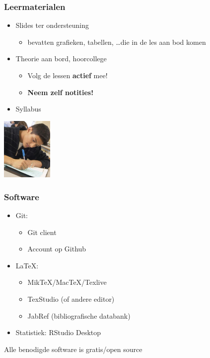 \documentclass{beamer}
\begin{document}
\begin{frame}
  \frametitle{Leermaterialen}

  \begin{itemize}
    \item Slides ter ondersteuning
      \begin{itemize}
        \item bevatten grafieken, tabellen, \ldots die in de les aan bod komen
      \end{itemize}
    \item Theorie aan bord, hoorcollege
      \begin{itemize}
        \item Volg de lessen \textbf{actief} mee!
        \item \textbf{Neem zelf notities!}
      \end{itemize}
    \item Syllabus
  \end{itemize}


  \begin{center}
    \includegraphics[height=3cm]{img/intro-06.jpg}
  \end{center}

\end{frame}

\begin{frame}
    \frametitle{Software}
    
    \begin{itemize}
        \item Git:
        \begin{itemize}
            \item Git client
            \item Account op Github
        \end{itemize}
        \item {\LaTeX}:
        \begin{itemize}
            \item MikTeX/MacTeX/Texlive
            \item TexStudio (of andere editor)
            \item JabRef (bibliografische databank)
        \end{itemize}
        \item Statistiek: RStudio Desktop
    \end{itemize}

    \centering
    Alle benodigde software is gratis/open source
\end{frame}
\end{document}
